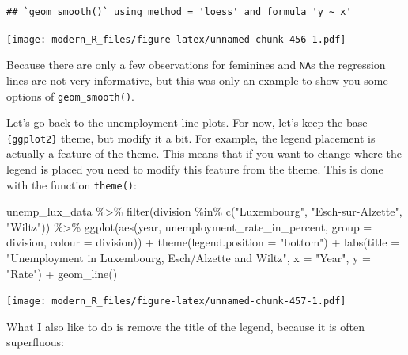 \documentclass[
]{article}
\newenvironment{Shaded}{\begin{snugshade}}{\end{snugshade}}
\newcommand{\AttributeTok}[1]{\textcolor[rgb]{0.77,0.63,0.00}{#1}}
\newcommand{\FunctionTok}[1]{\textcolor[rgb]{0.00,0.00,0.00}{#1}}
\newcommand{\NormalTok}[1]{#1}
\newcommand{\SpecialCharTok}[1]{\textcolor[rgb]{0.00,0.00,0.00}{#1}}
\newcommand{\StringTok}[1]{\textcolor[rgb]{0.31,0.60,0.02}{#1}}
\begin{document}
\begin{verbatim}
## `geom_smooth()` using method = 'loess' and formula 'y ~ x'
\end{verbatim}

\texttt{[image: modern\_R\_files/figure-latex/unnamed-chunk-456-1.pdf]}

Because there are only a few observations for feminines and \texttt{NA}s the regression lines are not very informative,
but this was only an example to show you some options of \texttt{geom\_smooth()}.

Let's go back to the unemployment line plots. For now, let's keep the base \texttt{\{ggplot2\}} theme, but
modify it a bit. For example, the legend placement is actually a feature of the theme. This means
that if you want to change where the legend is placed you need to modify this feature from the
theme. This is done with the function \texttt{theme()}:

\begin{Shaded}
\begin{Highlighting}[]
\NormalTok{unemp\_lux\_data }\SpecialCharTok{\%\textgreater{}\%}
  \FunctionTok{filter}\NormalTok{(division }\SpecialCharTok{\%in\%} \FunctionTok{c}\NormalTok{(}\StringTok{"Luxembourg"}\NormalTok{, }\StringTok{"Esch{-}sur{-}Alzette"}\NormalTok{, }\StringTok{"Wiltz"}\NormalTok{)) }\SpecialCharTok{\%\textgreater{}\%}
  \FunctionTok{ggplot}\NormalTok{(}\FunctionTok{aes}\NormalTok{(year, unemployment\_rate\_in\_percent, }\AttributeTok{group =}\NormalTok{ division, }\AttributeTok{colour =}\NormalTok{ division)) }\SpecialCharTok{+}
  \FunctionTok{theme}\NormalTok{(}\AttributeTok{legend.position =} \StringTok{"bottom"}\NormalTok{) }\SpecialCharTok{+}
  \FunctionTok{labs}\NormalTok{(}\AttributeTok{title =} \StringTok{"Unemployment in Luxembourg, Esch/Alzette and Wiltz"}\NormalTok{, }\AttributeTok{x =} \StringTok{"Year"}\NormalTok{, }\AttributeTok{y =} \StringTok{"Rate"}\NormalTok{) }\SpecialCharTok{+}
  \FunctionTok{geom\_line}\NormalTok{()}
\end{Highlighting}
\end{Shaded}

\texttt{[image: modern\_R\_files/figure-latex/unnamed-chunk-457-1.pdf]}

What I also like to do is remove the title of the legend, because it is often superfluous:
\end{document}

